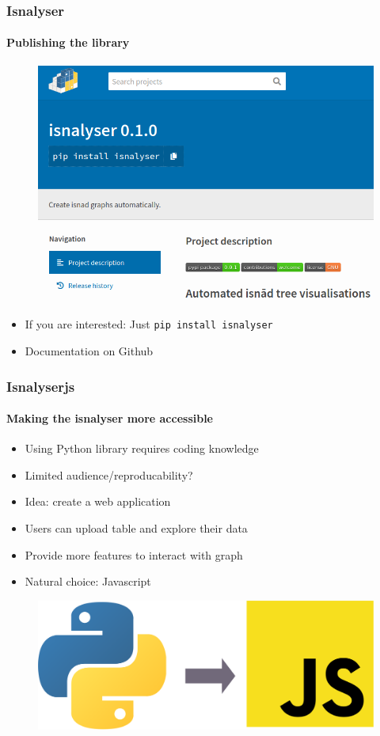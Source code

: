 \documentclass[9pt]{beamer}
\begin{document}
\begin{frame}
\frametitle{Isnalyser}
\framesubtitle{Publishing the library}
	\begin{figure}
	\flushleft
	\includegraphics[width=.6\linewidth]{figures/pypi.png}
\end{figure}
\begin{itemize}%
	\pause
	\item If you are interested: Just \texttt{pip install isnalyser}
	\item Documentation on Github
\end{itemize}
\end{frame} 



\begin{frame}
\frametitle{Isnalyserjs}
\framesubtitle{Making the isnalyser more accessible}
\begin{itemize}%
	\item Using Python library requires coding knowledge
	\item Limited audience/reproducability?
	\pause
	\item Idea: create a web application
	\item Users can upload table and explore their data
	\item Provide more features to interact with graph
	\pause
	\item Natural choice: Javascript
\end{itemize}
	\begin{figure}
	\includegraphics[width=.6\linewidth]{figures/python2js.pdf}
\end{figure}
\end{frame} 
\end{document}
